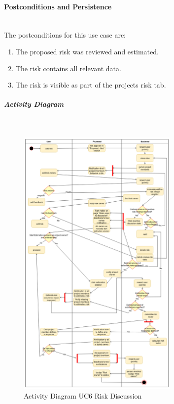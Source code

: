\paragraph*{Postconditions and Persistence}\mbox{}\\
The postconditions for this use case are:
\begin{enumerate}
	\vspace{-3mm}
	\setlength\itemsep{-1em}	
	\item The proposed risk was reviewed and estimated. 
	\item The risk contains all relevant data.
	\item The risk is visible as part of the projects risk tab.
\end{enumerate}

\newpage
\subparagraph{Activity Diagram}\mbox{}\\
\begin{figure}[H]
	\centering
	\includegraphics[width=0.70\textwidth]{Content/Domain/UC6RiskDiscussion.png}
	\caption{Activity Diagram \ac{UC}6 Risk Discussion}
	\label{fig:label66}
\end{figure}